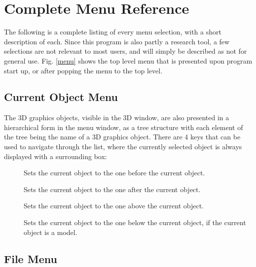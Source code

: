 \section{Complete Menu Reference}


The following is a complete listing of every menu selection, with a
short description of each.
Since this program is also partly a research tool, a few selections are
not relevant to most users, and will simply be described as not for general
use.  Fig. \ref{menu} shows the top level menu that is presented upon
program start up, or after popping the menu to the top level.

\subsection{Current Object Menu}

The 3D graphics objects, visible in the 3D window, are also presented
in a hierarchical form in the menu window, as a tree structure with
each element of the tree being the name of a 3D graphics object.
There are 4 keys that can be used to navigate through the list, where
the currently selected object is always displayed with a surrounding
box:

\begin{description}
\item[]  Sets the current object to the one before
                the current object.
\item[]  Sets the current object to the one after
                the current object.
\item[]  Sets the current object to the one above
                the current object.
\item[]  Sets the current object to the one below
                the current object, if the current object is a model.
\end{description}

\subsection{File Menu}

